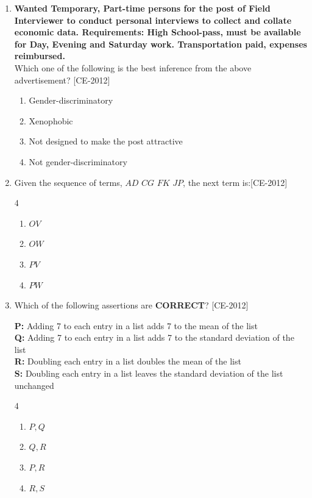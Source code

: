\documentclass[journal]{IEEEtran}
\begin{document}
\begin{enumerate}
    \item \textbf{Wanted Temporary, Part-time persons for the post of Field Interviewer to conduct personal interviews to collect and collate economic data. Requirements: High School-pass, must be available for Day, Evening and Saturday work. Transportation paid, expenses reimbursed.} \\

      Which one of the following is the best inference from the above advertisement? \hfill{[CE-2012]}
    

    \begin{enumerate}
        \item Gender-discriminatory
        \item Xenophobic
        \item Not designed to make the post attractive
        \item Not gender-discriminatory
    \end{enumerate}
    

    \item Given the sequence of terms, $AD$ $CG$ $FK$ $JP$, the next term is:\hfill{[CE-2012]}
\begin{multicols}{4}
    

    \begin{enumerate}
        \item $OV$
        \item $OW$
        \item $PV$
        \item $PW$
    \end{enumerate}
    \end{multicols}

    \item Which of the following assertions are \textbf{CORRECT}? \hfill{[CE-2012]}

    \textbf{P:} Adding 7 to each entry in a list adds 7 to the mean of the list \\
    \textbf{Q:} Adding 7 to each entry in a list adds 7 to the standard deviation of the list \\
    \textbf{R:} Doubling each entry in a list doubles the mean of the list \\
    \textbf{S:} Doubling each entry in a list leaves the standard deviation of the list unchanged
\begin{multicols}{4}
    

    \begin{enumerate}
        \item $P, Q$
        \item $Q, R$
        \item $P, R$
        \item $R, S$
    \end{enumerate}
    \end{multicols}


\end{enumerate}
\end{document}
